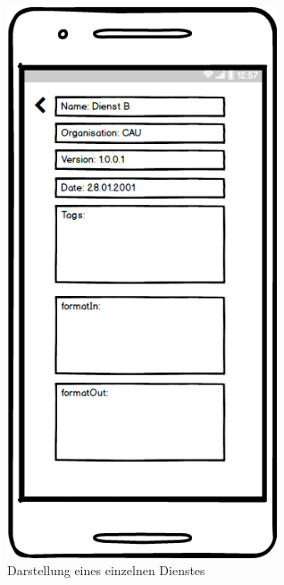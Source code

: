 \begin{figure}[ht]
	\centering
	\includegraphics[keepaspectratio,width=8cm]{img/Dienst_anzeigen_Dienst_B}
	\caption{Darstellung eines einzelnen Dienstes}
\end{figure}

